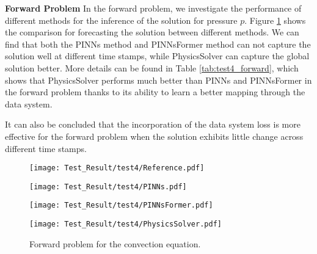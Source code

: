 \documentclass[preprint,11pt]{elsarticle}
\begin{document}
\textbf{Forward Problem}
In the forward problem, we investigate the performance of different methods for the inference of the solution for pressure $p$. Figure \ref{fig:test4_forward} shows the comparison for forecasting the solution between different methods. We can find that both the PINNs method and PINNsFormer method can not capture the solution well at different time stamps, while PhysicsSolver can capture the global solution better. More details can be found in Table \ref{tab:test4_forward}, which shows that PhysicsSolver performs much better than PINNs and PINNsFormer in the forward problem thanks to its ability to learn a better mapping through the data system. 
 
It can also be concluded that the incorporation of the data system loss is more effective for the forward problem when the solution exhibits little change across different time stamps. 
\begin{figure}[h]
\centering
    \begin{minipage}[b]{0.49\textwidth}
        \centering
        \texttt{[image: Test\_Result/test4/Reference.pdf]} 
    \end{minipage}
    \begin{minipage}[b]{0.49\textwidth}
        \centering
        \texttt{[image: Test\_Result/test4/PINNs.pdf]} 
    \end{minipage}
    \begin{minipage}[b]{0.49\textwidth}
        \centering
        \texttt{[image: Test\_Result/test4/PINNsFormer.pdf]} 
    \end{minipage}
    \begin{minipage}[b]{0.49\textwidth}
        \centering
        \texttt{[image: Test\_Result/test4/PhysicsSolver.pdf]} 
    \end{minipage}
    \caption{Forward problem for the convection equation.}
    \label{fig:test4_forward}
\end{figure}

\begin{table}[H]
\vspace{-15pt}
    
	\vskip 0.1in
	\centering
	\begin{small}
		\begin{sc}
			\renewcommand{\multirowsetup}{\centering}
			\setlength{\tabcolsep}{5.5pt}
		\end{sc}
	\end{small}
    \caption{Relative $l^2$ errors.}
	\label{tab:test4_forward}
\end{table}
\end{document}
